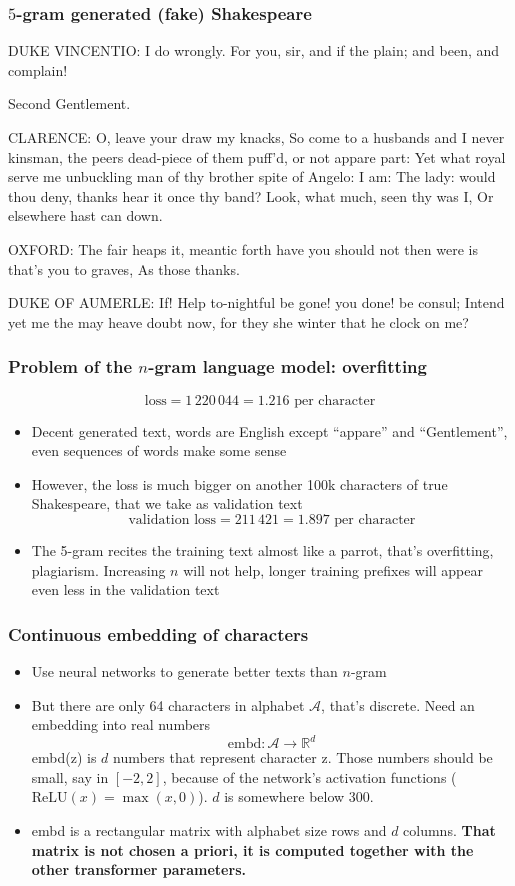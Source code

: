 \documentclass{beamer}
\begin{document}
\begin{frame}
\frametitle{$5$-gram generated (fake) Shakespeare}
DUKE VINCENTIO:
I do wrongly.
For you, sir, and if the plain; and been, and complain!

Second Gentlement.

CLARENCE:
O, leave your draw my knacks,
So come to a husbands and
I never kinsman, the peers dead-piece of them puff'd, or not appare part:
Yet what royal serve me unbuckling man of thy brother spite of Angelo:
I am:
The lady:
would thou deny, thanks hear it once thy band?
Look, what much, seen thy was I,
Or elsewhere hast can down.

OXFORD:
The fair heaps it, meantic forth have you should not then were is that's you to graves,
As those thanks.

DUKE OF AUMERLE:
If!
Help to-nightful be gone! you done! be consul;
Intend yet me the may heave
doubt now, for they she winter that he clock on me?
\end{frame}

\begin{frame}
\frametitle{Problem of the $n$-gram language model: overfitting}

$$ \text{loss} = 1\, 220\, 044 = 1.216 \text{ per character} $$
\begin{itemize}
\item Decent generated text, words are English except ``appare'' and ``Gentlement'', even sequences of words make some sense
\item However, the loss is much bigger on another 100k characters of true Shakespeare, that we take as validation text
$$ \text{validation loss} = 211\, 421 = 1.897 \text{ per character} $$
\item The 5-gram recites the training text almost like a parrot, that's overfitting, plagiarism. Increasing $n$ will not help, longer training prefixes will appear even less in the validation text
\end{itemize}
\end{frame}

\begin{frame}
\frametitle{Continuous embedding of characters}
\begin{itemize}
\item Use neural networks to generate better texts than $n$-gram

\bigskip
\item But there are only 64 characters in alphabet $\mathcal{A}$, that's discrete. Need an embedding into real numbers
$$ \text{embd} : \mathcal{A} \to \mathbb{R}^{d} $$
embd(z) is $d$ numbers that represent character z. Those numbers should be small, say in $[-2,2]$, because of the network's activation functions ($\text{ReLU}(x) =\max(x,0)$). $d$ is somewhere below 300.

\bigskip
\item embd is a rectangular matrix with alphabet size rows and $d$ columns. \textbf{That matrix is not chosen a priori, it is computed together with the other transformer parameters.}
\end{itemize}
\end{frame}
\end{document}
